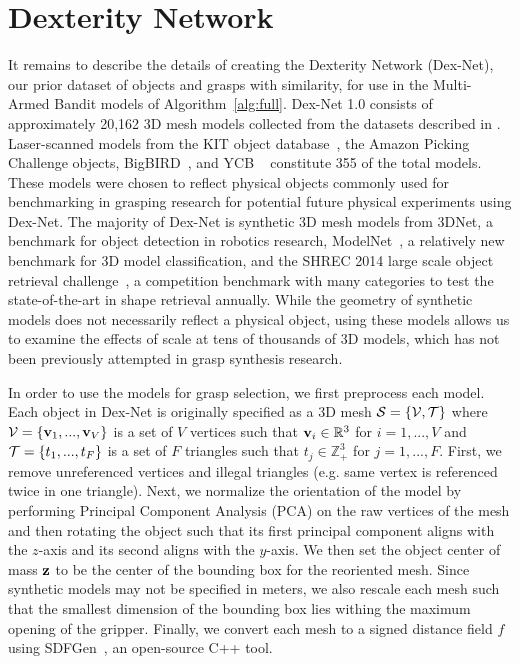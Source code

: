 \section{Dexterity Network}
It remains to describe the details of creating the Dexterity Network (Dex-Net), our prior dataset of objects and grasps with similarity, for use in the Multi-Armed Bandit models of Algorithm~\ref{alg:full}.
Dex-Net 1.0 consists of approximately 20,162 3D mesh models  collected from the datasets described in .
Laser-scanned models from the KIT object database~\cite{kasper2012kit}, the Amazon Picking Challenge objects, BigBIRD~\cite{singh2014bigbird}, and YCB ~\cite{calli2015benchmarking} constitute 355 of the total models.
These models were chosen to reflect physical objects commonly used for benchmarking in grasping research for potential future physical experiments using Dex-Net.
The majority of Dex-Net is synthetic 3D mesh models from 3DNet\cite{wohlkinger20123dnet}, a benchmark for object detection in robotics research,  ModelNet~\cite{wu20143d}, a relatively new benchmark for 3D model classification, and the SHREC 2014 large scale object retrieval challenge~\cite{li2015comparison}, a competition benchmark with many categories to test the state-of-the-art in shape retrieval annually.
While the geometry of synthetic models does not necessarily reflect a physical object, using these models allows us to examine the effects of scale at tens of thousands of 3D models, which has not been previously attempted in grasp synthesis research.

In order to use the models for grasp selection, we first preprocess each model.
Each object in Dex-Net is originally specified as a 3D mesh $\mathcal{S} = \{\mathcal{V}, \mathcal{T}\}$ where $\mathcal{V} = \{\mathbf{v}_1, ..., \mathbf{v}_V\}$ is a set of $V$ vertices such that $\mathbf{v}_i \in \mathbb{R}^3$ for $i = 1, ..., V$ and $\mathcal{T} = \{t_1, ..., t_F\}$  is a set of $F$ triangles such that $t_j \in \mathbb{Z}_{+}^3$ for $j = 1, ..., F$.
First, we remove unreferenced vertices and illegal triangles (e.g. same vertex is referenced twice in one triangle).
Next, we normalize the orientation of the model by performing Principal Component Analysis (PCA) on the raw vertices of the mesh and then rotating the object such that its first principal component aligns with the $z$-axis and its second aligns with the $y$-axis.
We then set the object center of mass $\mathbf{z}$ to be the center of the bounding box for the reoriented mesh.
Since synthetic models may not be specified in meters, we also rescale each mesh such that the smallest dimension of the bounding box lies withing the maximum opening of the gripper.
Finally, we convert each mesh to a signed distance field $f$ using SDFGen~\cite{}, an open-source C++ tool.


